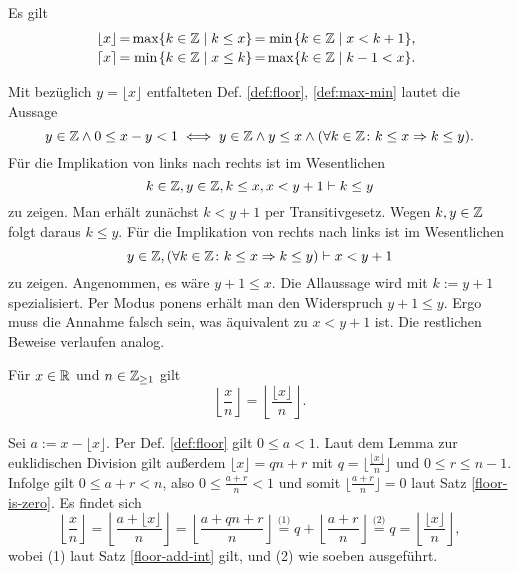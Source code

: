 \begin{Satz}
Es gilt
\[\begin{array}{@{}l@{\,}c@{\,}c@{}l@{\,}c@{\,}c@{}l}
\lfloor x\rfloor &=& \max &\{k\in\Z\mid k\le x\} &=& \min &\{k\in\Z\mid x < k + 1\},\\[2pt]
\lceil x\rceil &=& \min &\{k\in\Z\mid x\le k\} &=& \max &\{k\in\Z\mid k - 1 < x\}.
\end{array}\]
\end{Satz}
\begin{Beweis}
Mit bezüglich $y=\lfloor x\rfloor$ entfalteten Def. \ref{def:floor},
\ref{def:max-min} lautet die Aussage
\[y\in\mathbb Z\land 0\le x-y<1\iff
y\in\mathbb Z\land y\le x\land (\forall k\in\mathbb Z\colon k\le x\Rightarrow k\le y).\]
Für die Implikation von links nach rechts ist im Wesentlichen
\[k\in\mathbb Z, y\in\mathbb Z, k\le x, x < y+1\vdash k\le y\]
zu zeigen. Man erhält zunächst $k < y+1$ per Transitivgesetz.
Wegen $k,y\in\mathbb Z$ folgt daraus $k\le y$. Für die Implikation von rechts
nach links ist im Wesentlichen
\[y\in\mathbb Z,(\forall k\in\mathbb Z\colon k\le x\Rightarrow k\le y)\vdash x < y + 1\]
zu zeigen. Angenommen, es wäre $y+1\le x$. Die Allaussage wird mit
$k:=y+1$ spezialisiert. Per Modus ponens erhält man den Widerspruch
$y+1\le y$. Ergo muss die Annahme falsch sein, was äquivalent zu
$x<y+1$ ist. Die restlichen Beweise verlaufen analog.\,\qedsymbol
\end{Beweis}

\begin{Satz}\label{floor-div-floor}
Für $x\in\mathbb R$ und $n\in\mathbb Z_{\ge 1}$ gilt
\[\left\lfloor\frac{x}{n}\right\rfloor
= \left\lfloor\frac{\lfloor x\rfloor}{n}\right\rfloor.\]
\end{Satz}
\begin{Beweis}
Sei $a:=x-\lfloor x\rfloor$. Per Def. \ref{def:floor} gilt $0 \le a < 1$.
Laut dem Lemma zur euklidischen Division gilt außerdem
$\lfloor x\rfloor = qn+r$
mit $q=\lfloor\frac{\lfloor x\rfloor}{n}\rfloor$
und $0\le r\le n - 1$. Infolge gilt $0\le a+r<n$, also
$0\le\frac{a+r}{n}<1$ und somit $\lfloor\frac{a+r}{n}\rfloor = 0$
laut Satz \ref{floor-is-zero}.
Es findet sich%
\[\left\lfloor\frac{x}{n}\right\rfloor
= \left\lfloor\frac{a+\lfloor x\rfloor}{n}\right\rfloor
= \left\lfloor\frac{a+qn+r}{n}\right\rfloor
\stackrel{\text{(1)}}= q + \left\lfloor\frac{a+r}{n}\right\rfloor
\stackrel{\text{(2)}}= q =
\left\lfloor\frac{\lfloor x\rfloor}{n}\right\rfloor,\]
wobei (1) laut Satz \ref{floor-add-int} gilt, und (2)
wie soeben ausgeführt.\,\qedsymbol
\end{Beweis}


